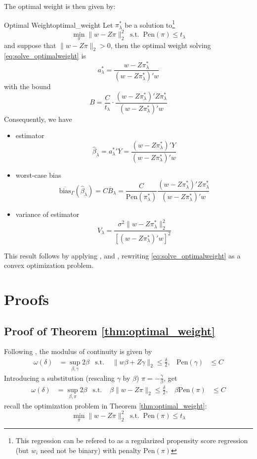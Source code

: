\documentclass[twoside]{article}
\let\bar\overline
\theoremstyle{definition}
\begin{document}
The optimal weight is then given by:
\begin{theorem}{Optimal Weight}{optimal_weight}
  Let $\pi^*_{\lambda}$ be a solution to\footnote{This regression can be refered to as a regularized propensity score regression (but $w_i$ need not be binary) with penalty $\mathrm{Pen}(\pi)$}
  \begin{equation}\label{eq:penalizedreg}
    \min_{\pi}\lVert w-Z\pi \rVert^2_2 \ \text{ s.t. }\ \mathrm{Pen}(\pi)\leq t_{\lambda}
  \end{equation}
  and suppose that $\lVert w-Z\pi \rVert_2>0$, then the optimal weight solving \ref{eq:solve_optimalweight} is $$ a^*_{\lambda}=\frac{w-Z\pi_{\lambda}^*}{\left(w-Z\pi_{\lambda}^*\right)'w} $$
  with the bound $$ B=\frac{C}{t_{\lambda}}\cdot \frac{\left(w-Z\pi_{\lambda}^*\right)' Z\pi^*_{\lambda}}{\left(w-Z\pi_{\lambda}^*\right)'w} $$
  Consequently, we have 
  \begin{itemize}
    \item estimator $$ \hat{\beta}_{\lambda} = {a^*_{\lambda}}' Y= \frac{\left( w-Z\pi_{\lambda}^* \right)'Y}{\left(w-Z\pi_{\lambda}^*\right)'w} $$
    \item worst-case bias $$ \bar{\mathrm{bias}}_{\Gamma}\left(\hat{\beta}_{\lambda}\right) = C\bar{B}_{\lambda} = \frac{C}{\mathrm{Pen}\left(\pi^*_{\lambda}\right)}  \frac{\left( w-Z\pi_{\lambda}^* \right)'Z\pi^*_{\lambda}}{\left(w-Z\pi_{\lambda}^*\right)'w}$$
    \item variance of estimator $$ V_{\lambda} = \frac{\sigma^2 \lVert w-Z\pi_{\lambda}^* \rVert^2_2}{\left[ \left(w-Z\pi_{\lambda}^*\right)'w \right]^2} $$ 
  \end{itemize}
\end{theorem}

This result follows by applying \citet{donoho1994statistical}, \citet{low1995bias} and \citet{armstrong2018optimal}, rewriting \ref{eq:solve_optimalweight} as a convex optimization problem.

\newpage
\appendix
\section{Proofs}
\subsection{Proof of Theorem \ref{thm:optimal_weight}}
Following \citet[Equation (25)]{armstrong2018optimal}, the modulus of continuity is given by 
\begin{align*}
  \omega(\delta) &=\sup_{\beta,\gamma}2\beta &\text{s.t.\ }&\lVert w\beta+Z\gamma \rVert_2 \leq \frac{\delta}{2}, &\mathrm{Pen}(\gamma) &\leq C
\end{align*}
Introducing a substitution (rescaling $\gamma$ by $\beta$) $\pi = -\frac{\gamma}{\beta}$, get 
\begin{align}\label{eq:continuity_modulus}
  \omega(\delta) &=\sup_{\beta,\pi}2\beta &\text{s.t.\ }&\beta\lVert w-Z\pi \rVert_2 \leq \frac{\delta}{2}, &\beta\mathrm{Pen}(\pi) &\leq C
\end{align}
recall the optimization problem in Theorem \ref{thm:optimal_weight}:
$$ \min_{\pi}\lVert w-Z\pi \rVert^2_2 \ \text{ s.t. }\ \mathrm{Pen}(\pi)\leq t_{\lambda} $$
\end{document}
